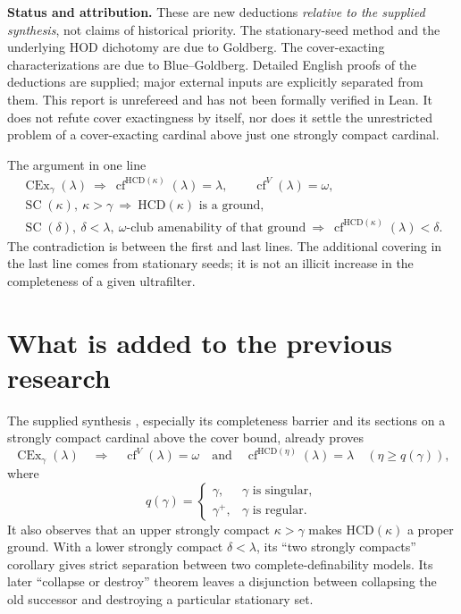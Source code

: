 \documentclass[11pt,letterpaper]{article}
\theoremstyle{definition}
\numberwithin{equation}{section}
\newcommand{\HCD}{\mathrm{HCD}}
\newcommand{\SC}{\operatorname{SC}}
\newcommand{\CEx}{\operatorname{CEx}}
\newcommand{\cf}{\operatorname{cf}}
\begin{document}
\textbf{Status and attribution.}
These are new deductions \emph{relative to the supplied synthesis}, not
claims of historical priority. The stationary-seed method and the
underlying HOD dichotomy are due to Goldberg. The cover-exacting
characterizations are due to Blue--Goldberg. Detailed English proofs of
the deductions are supplied; major external inputs are explicitly
separated from them. This report is unrefereed and has not been formally
verified in Lean. It does not refute cover exactingness by itself, nor
does it settle the unrestricted problem of a cover-exacting cardinal
above just one strongly compact cardinal.

\newpage
\tableofcontents
\vspace{9pt}
\begin{assessment}{The argument in one line}
\[
\begin{gathered}
\CEx_\gamma(\lambda)
\ \Longrightarrow\ \cf^{\HCD(\kappa)}(\lambda)=\lambda,
\qquad \cf^V(\lambda)=\omega,\\
\SC(\kappa),\ \kappa>\gamma
\ \Longrightarrow\ \HCD(\kappa)\text{ is a ground},\\
\SC(\delta),\ \delta<\lambda,
\ \omega\text{-club amenability of that ground}
\ \Longrightarrow\ \cf^{\HCD(\kappa)}(\lambda)<\delta.
\end{gathered}
\]
The contradiction is between the first and last lines. The additional
covering in the last line comes from stationary seeds; it is not an
illicit increase in the completeness of a given ultrafilter.
\end{assessment}

\newpage
\section{What is added to the previous research}\label{sec:contribution}

The supplied synthesis \cite{archive}, especially its completeness
barrier and its sections on a strongly compact cardinal above the cover
bound, already proves
\begin{equation}\label{eq:inherited-gap}
\CEx_\gamma(\lambda)
\quad\Longrightarrow\quad
\cf^V(\lambda)=\omega
\quad\text{and}\quad
\cf^{\HCD(\eta)}(\lambda)=\lambda
\quad(\eta\ge q(\gamma)),
\end{equation}
where
\[
q(\gamma)=
\begin{cases}
\gamma,&\gamma\text{ is singular},\\
\gamma^+,&\gamma\text{ is regular}.
\end{cases}
\]
It also observes that an upper strongly compact $\kappa>\gamma$ makes
$\HCD(\kappa)$ a proper ground. With a lower strongly compact
$\delta<\lambda$, its ``two strongly compacts'' corollary gives strict
separation between two complete-definability models. Its later
``collapse or destroy'' theorem leaves a disjunction between collapsing
the old successor and destroying a particular stationary set.
\end{document}

